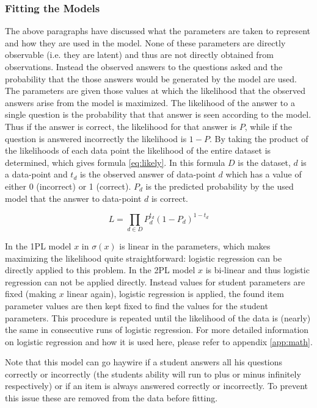 \documentclass{scrartcl}
\begin{document}
\subsubsection{Fitting the Models}
The above paragraphs have discussed what the parameters are taken to represent and how they are used in the model. None of these parameters are directly observable (i.e. they are latent) and thus are not directly obtained from observations. Instead the observed answers to the questions asked and the probability that the those answers would be generated by the model are used. The parameters are given those values at which the likelihood that the observed answers arise from the model is maximized. The likelihood of the answer to a single question is the probability that that answer is seen according to the model. Thus if the answer is correct, the likelihood for that answer is $P$, while if the question is answered incorrectly the likelihood is $1-P$. By taking the product of the likelihoods of each data point the likelihood of the entire dataset is determined, which gives formula \ref{eq:likely}. In this formula $D$ is the dataset, $d$ is a data-point and $t_{d}$ is the observed answer of data-point $d$ which has a value of either 0 (incorrect) or 1 (correct). $P_{d}$ is the predicted probability by the used model that the answer to data-point $d$ is correct.

\begin{equation}
\label{eq:likely}
L=\prod_{d \in D} P_{d}^{t_d}  (1- P_{d})^{1-t_d}
\end{equation}

In the 1PL model $x$ in $\sigma(x)$ is linear in the parameters, which makes maximizing the likelihood quite straightforward: logistic regression can be directly applied to this problem. In the 2PL model $x$ is bi-linear and thus logistic regression can not be applied directly. Instead values for student parameters are fixed (making $x$ linear again), logistic regression is applied, the found item parameter values are then kept fixed to find the values for the student parameters. This procedure is repeated until the likelihood of the data is (nearly) the same in consecutive runs of logistic regression. For more detailed information on logistic regression and how it is used here, please refer to appendix \ref{app:math}.

Note that this model can go haywire if a student answers all his questions correctly or incorrectly (the students ability will run to plus or minus infinitely respectively) or if an item is always answered correctly  or incorrectly. To prevent this issue these are removed from the data before fitting.
\end{document}
